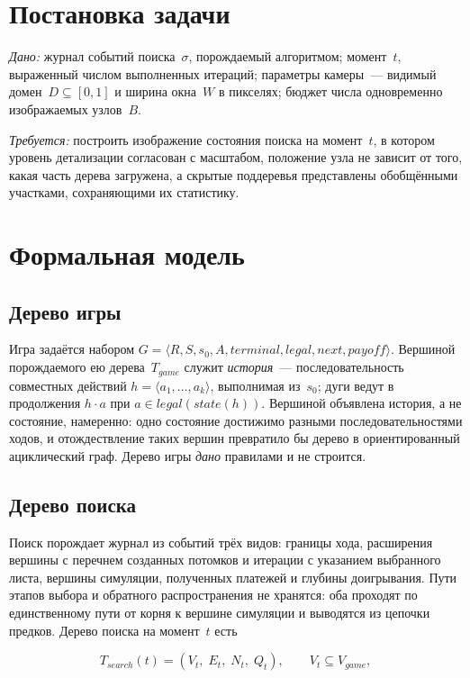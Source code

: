 \documentclass[12pt,a4paper]{article}
\begin{document}
\section{Постановка задачи}

\emph{Дано:} журнал событий поиска~$\sigma$, порождаемый алгоритмом;
момент~$t$, выраженный числом выполненных итераций; параметры камеры~---
видимый домен~$D \subseteq [0,1]$ и ширина окна~$W$ в пикселях; бюджет
числа одновременно изображаемых узлов~$B$.

\emph{Требуется:} построить изображение состояния поиска на момент~$t$, в
котором уровень детализации согласован с масштабом, положение узла не
зависит от того, какая часть дерева загружена, а скрытые поддеревья
представлены обобщёнными участками, сохраняющими их статистику.

\section{Формальная модель}

\subsection{Дерево игры}

Игра задаётся набором $G = \langle R, S, s_0, A, terminal, legal, next,
payoff \rangle$. Вершиной порождаемого ею дерева~$T_{game}$ служит
\emph{история}~--- последовательность совместных действий $h = \langle a_1,
\dots, a_k \rangle$, выполнимая из~$s_0$; дуги ведут в продолжения $h \cdot
a$ при $a \in legal(state(h))$. Вершиной объявлена история, а не состояние,
намеренно: одно состояние достижимо разными последовательностями ходов, и
отождествление таких вершин превратило бы дерево в ориентированный
ациклический граф. Дерево игры \emph{дано} правилами и не строится.

\subsection{Дерево поиска}

Поиск порождает журнал из событий трёх видов: границы хода, расширения
вершины с перечнем созданных потомков и итерации с указанием выбранного
листа, вершины симуляции, полученных платежей и глубины доигрывания. Пути
этапов выбора и обратного распространения не хранятся: оба проходят по
единственному пути от корня к вершине симуляции и выводятся из цепочки
предков. Дерево поиска на момент~$t$ есть

\begin{equation}
T_{search}(t) = (V_t,\; E_t,\; N_t,\; Q_t), \qquad V_t \subseteq V_{game},
\end{equation}
\end{document}
